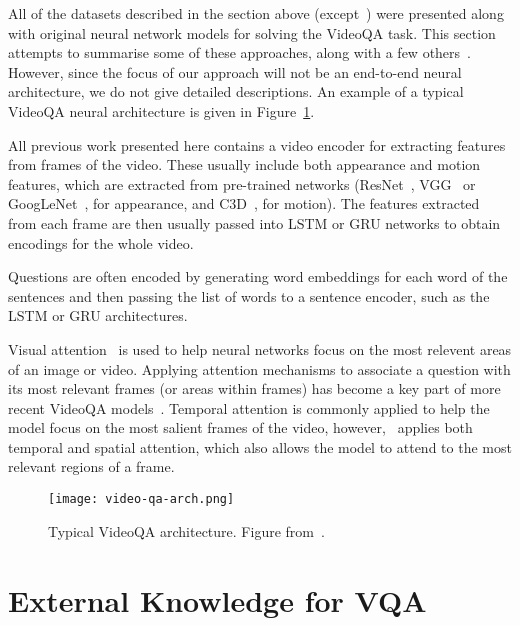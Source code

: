 \documentclass[../interim.tex]{subfiles}
\begin{document}
All of the datasets described in the section above (except~\cite{dataset:ego-vqa}) were presented along with original neural network models for solving the VideoQA task. This section attempts to summarise some of these approaches, along with a few others~\cite{videoqa:co-mem, videoqa:cwd, videoqa:mm-att, videoqa:strr}. However, since the focus of our approach will not be an end-to-end neural architecture, we do not give detailed descriptions. An example of a typical VideoQA neural architecture is given in Figure~\ref{fig:video-qa-arch}.

All previous work presented here contains a video encoder for extracting features from frames of the video. These usually include both appearance and motion features, which are extracted from pre-trained networks (ResNet~\cite{resnet}, VGG~\cite{vgg} or GoogLeNet~\cite{googlenet}, for appearance, and C3D~\cite{c3d}, for motion). The features extracted from each frame are then usually passed into LSTM or GRU networks to obtain encodings for the whole video.

Questions are often encoded by generating word embeddings for each word of the sentences and then passing the list of words to a sentence encoder, such as the LSTM or GRU architectures.

Visual attention~\cite{visual-attention} is used to help neural networks focus on the most relevent areas of an image or video. Applying attention mechanisms to associate a question with its most relevant frames (or areas within frames) has become a key part of more recent VideoQA models~\cite{dataset:tgif-qa, dataset:xu, dataset:youtube2text-qa, dataset:tvqa, videoqa:co-mem, videoqa:cwd, videoqa:mm-att, dataset:pororo-qa}. Temporal attention is commonly applied to help the model focus on the most salient frames of the video, however,~\cite{dataset:tgif-qa} applies both temporal and spatial attention, which also allows the model to attend to the most relevant regions of a frame.

\begin{figure}
  \centering
  \texttt{[image: video-qa-arch.png]}
  \caption{Typical VideoQA architecture. Figure from~\cite{dataset:ego-vqa}.}
  \label{fig:video-qa-arch}
\end{figure}


\section{External Knowledge for VQA}
\end{document}
